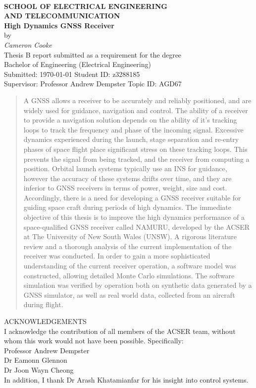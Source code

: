 \begin{center}
\\[0.5cm]
\textbf{\large SCHOOL OF ELECTRICAL ENGINEERING\\
AND TELECOMMUNICATION}\\[2cm]
{\addtolength{\baselineskip}{0.5cm}
\textbf{\Huge
High Dynamics GNSS Receiver}\\[0.5cm]
}
{\Large by}\\[0.5cm]
\textit{\huge
Cameron Cooke} \\[1.5cm]
{\Large
Thesis B report submitted as a requirement for the degree\\
Bachelor of Engineering (Electrical Engineering)\\[2ex]
\vfill
Submitted: \today\hfill
Student ID: z3288185\\[-1.5ex]
Supervisor: Professor Andrew Dempster\hfill
Topic ID: AGD67\\
\vspace*{-1cm}
}
\end{center}


\begin{abstract}
A \ac{GNSS} allows a receiver to be accurately and reliably positioned, and are widely used for guidance, navigation and control.
The ability of a receiver to provide a navigation solution
depends on the ability of it's tracking loops to track the 
frequency and phase of the incoming signal. Excessive dynamics 
experienced during the launch, stage separation and re-entry phases
of space flight place significant stress on these tracking loops. 
This prevents the signal from being tracked, and the receiver from
computing a position. Orbital launch systems typically use an
\ac{INS} for guidance, however the accuracy
of these systems drifts over time, and they are inferior to \ac{GNSS}
receivers in terms of power, weight, size and cost. Accordingly, there is a
need for developing a \ac{GNSS} receiver suitable for guiding 
space craft during periods of high dynamics. The immediate objective of this thesis
is to improve the high dynamics performance of a space-qualified 
\ac{GNSS} receiver called \ac{NAMURU}, developed by the \ac{ACSER} at The University of 
New South Wales (UNSW). A rigorous literature review and a thorough analysis of the current implementation of the receiver was conducted.
In order to gain a more sophisticated understanding of the current receiver operation,
a software model was constructed, allowing detailed Monte Carlo simulations.
The software simulation was verified by operation both on synthetic data generated by a \ac{GNSS}
simulator, as well as real world data, collected from an aircraft during flight.
\end{abstract}


ACKNOWLEDGEMENTS\\
I acknowledge the contribution of all members of the ACSER team, without whom this work would not have been possible. Specifically:\\
Professor Andrew Dempster\\
Dr Eamonn Glennon\\
Dr Joon Wayn Cheong\\
In addition, I thank Dr Arash Khatamianfar for his insight into control systems.
